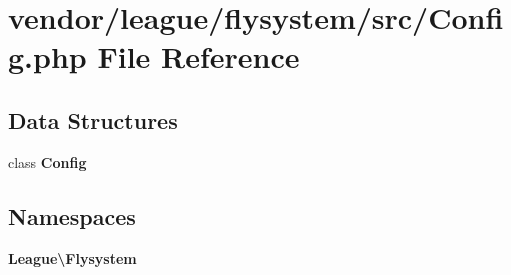 \section{vendor/league/flysystem/src/\+Config.php File Reference}
\label{league_2flysystem_2src_2_config_8php}
\subsection*{Data Structures}
\begin{DoxyCompactItemize}
\item 
class {\bf Config}
\end{DoxyCompactItemize}
\subsection*{Namespaces}
\begin{DoxyCompactItemize}
\item 
 {\bf League\textbackslash{}\+Flysystem}
\end{DoxyCompactItemize}
